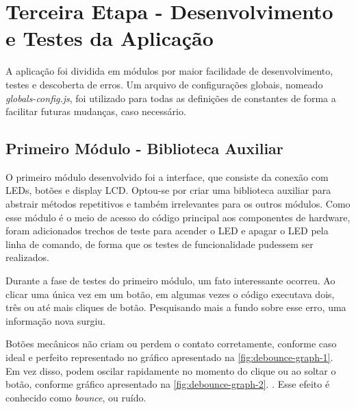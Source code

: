 \documentclass[
		12pt,				%
		openright,			%
		oneside,			%
		a4paper,			%
		chapter=TITLE,		%
		english,			%
		brazil				%
	]{abntex2}
\begin{document}
\section{Terceira Etapa - Desenvolvimento e Testes da Aplicação}\label{sec:terceira-etapa}

A aplicação foi dividida em módulos por maior facilidade de desenvolvimento, testes e descoberta de erros. Um arquivo de configurações globais, nomeado \textit{globals-config.js}, foi utilizado para todas as definições de constantes de forma a facilitar futuras mudanças, caso necessário. 

\subsection{Primeiro Módulo - Biblioteca Auxiliar}\label{sec:primeiro-modulo}

O primeiro módulo desenvolvido foi a interface, que consiste da conexão com LEDs, botões e display LCD. Optou-se por criar uma biblioteca auxiliar para abstrair métodos repetitivos e também irrelevantes para os outros módulos. Como esse módulo é o meio de acesso do código principal aos componentes de hardware, foram adicionados trechos de teste para acender o LED e apagar o LED pela linha de comando, de forma que os testes de funcionalidade pudessem ser realizados.

Durante a fase de testes do primeiro módulo, um fato interessante ocorreu. Ao clicar uma única vez em um botão, em algumas vezes o código executava dois, três ou até mais cliques de botão. Pesquisando mais a fundo sobre esse erro, uma informação nova surgiu. 

Botões mecânicos não criam ou perdem o contato corretamente, conforme caso ideal e perfeito representado no gráfico apresentado na \autoref{fig:debounce-graph-1}. Em vez disso, podem oscilar rapidamente no momento do clique ou ao soltar o botão, conforme gráfico apresentado na \autoref{fig:debounce-graph-2}. \cite{debounce-graph}. Esse efeito é conhecido como \textit{bounce}, ou ruído.
\end{document}

